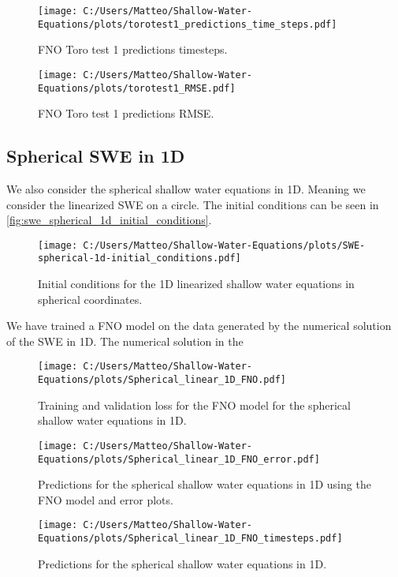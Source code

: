 \begin{figure}[H]
    \centering
    \texttt{[image: C:/Users/Matteo/Shallow-Water-Equations/plots/torotest1\_predictions\_time\_steps.pdf]}
    \caption{FNO Toro test 1 predictions timesteps.}\label{fig:FNO_Toro_test1_predictions_time_steps}
\end{figure}


\begin{figure}[H]
    \centering
    \texttt{[image: C:/Users/Matteo/Shallow-Water-Equations/plots/torotest1\_RMSE.pdf]}
    \caption{FNO Toro test 1 predictions RMSE.}\label{fig:FNO_Toro_test1_rmse}
\end{figure}

\subsection{Spherical SWE in 1D}
We also consider the spherical shallow water equations in 1D.
Meaning we consider the linearized SWE on a circle.
The initial conditions can be seen in \autoref{fig:swe_spherical_1d_initial_conditions}.
\begin{figure}[H]
    \centering
    \texttt{[image: C:/Users/Matteo/Shallow-Water-Equations/plots/SWE-spherical-1d-initial\_conditions.pdf]}
    \caption{Initial conditions for the 1D linearized shallow water equations in spherical coordinates.}\label{fig:swe_spherical_1d_initial_conditions}
\end{figure}
We have trained a FNO model on the data generated by the numerical solution of the SWE in 1D.
The numerical solution in the 

\begin{figure}[H]
    \centering
    \texttt{[image: C:/Users/Matteo/Shallow-Water-Equations/plots/Spherical\_linear\_1D\_FNO.pdf]}
    \caption{Training and validation loss for the FNO model for the spherical shallow water equations in 1D.}\label{fig:Spherical_linear_1D_FNO}
\end{figure}

\begin{figure}[H]
    \centering
    \texttt{[image: C:/Users/Matteo/Shallow-Water-Equations/plots/Spherical\_linear\_1D\_FNO\_error.pdf]}
    \caption{Predictions for the spherical shallow water equations in 1D using the FNO model and error plots.}\label{fig:Spherical_linear_1D_FNO_error}
\end{figure}

\begin{figure}[H]
    \centering
    \texttt{[image: C:/Users/Matteo/Shallow-Water-Equations/plots/Spherical\_linear\_1D\_FNO\_timesteps.pdf]}
    \caption{Predictions for the spherical shallow water equations in 1D.}\label{fig:Spherical_linear_1D_FNO_predictions_timesteps}
\end{figure}


